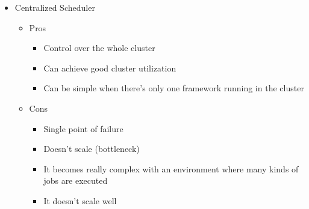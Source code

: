 \documentclass{beamer}
\begin{document}
  \begin{frame}
    \begin{itemize}
      \item Centralized Scheduler
      \begin{itemize}
        \item Pros
        \begin{itemize}
          \item Control over the whole cluster
          \item Can achieve good cluster utilization
          \item Can be simple when there's only one framework running in the cluster
        \end{itemize}
      \end{itemize}
      \begin{itemize}
        \item Cons
        \begin{itemize}
          \item Single point of failure
          \item Doesn't scale (bottleneck)
          \item It becomes really complex with an environment where many kinds of 
                jobs are executed
          \item It doesn't scale well
        \end{itemize}
      \end{itemize}
    \end{itemize}

  \end{frame}
\end{document}
